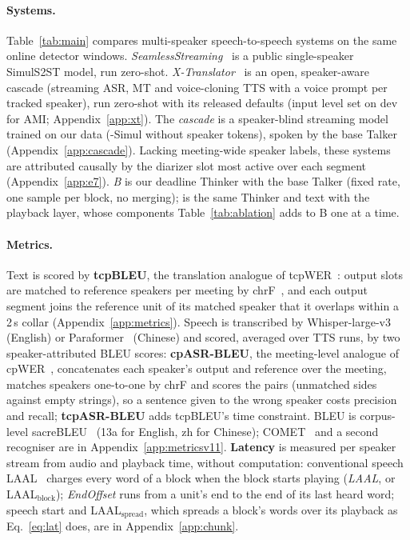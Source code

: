 \paragraph{Systems.} Table~\ref{tab:main} compares multi-speaker speech-to-speech systems on the same online detector
windows. \emph{SeamlessStreaming}~\citep{seamless2023} is a public single-speaker SimulS2ST model, run zero-shot.\ifXT{} \emph{X-Translator}~\citep{zhao2026xtranslator} is an open, speaker-aware cascade (streaming
ASR, MT and voice-cloning TTS with a voice prompt per tracked speaker), run zero-shot with its released defaults (input level set on dev for AMI; Appendix~\ref{app:xt}).\fi\ifCascade{} The
\emph{cascade} is a speaker-blind streaming model trained on our data (\sys{}-Simul without speaker tokens), spoken by
the base Talker (Appendix~\ref{app:cascade}).\fi{} Lacking meeting-wide speaker labels, these
systems are attributed causally by the diarizer slot most active over each segment (Appendix~\ref{app:e7}). \emph{B} is our deadline Thinker with the
base Talker (fixed rate, one sample per block, no merging); \sys{} is the same Thinker and text with the playback layer,
whose components Table~\ref{tab:ablation} adds to B one at a time.

\paragraph{Metrics.} Text is scored by \textbf{tcpBLEU}, the translation analogue of tcpWER~\citep{neumann2023meeteval}:
output slots are matched to reference speakers per meeting by chrF~\citep{popovic2015chrf}, and each output segment
joins the reference unit of its matched speaker that it overlaps within a 2\,s collar (Appendix~\ref{app:metrics}).
Speech is transcribed by Whisper-large-v3~\citep{radford2023robust} (English) or Paraformer~\citep{gao2022paraformer}
(Chinese) and scored, averaged over TTS runs, by two speaker-attributed BLEU scores: \textbf{cpASR-BLEU}, the
meeting-level analogue of cpWER~\citep{watanabe2020chime6}, concatenates each speaker's output and reference over the
meeting, matches speakers one-to-one by chrF and scores the pairs (unmatched sides against empty strings), so a sentence
given to the wrong speaker costs precision and recall; \textbf{tcpASR-BLEU} adds tcpBLEU's time constraint. BLEU is corpus-level sacreBLEU~\citep{post2018call}
(13a for English, zh for Chinese)\ifMetricsV{}; COMET~\citep{rei2022comet} and a second recogniser are in
Appendix~\ref{app:metricsv11}\fi. \textbf{Latency} is measured per speaker stream from audio and playback time, without
computation: conventional speech LAAL~\citep{papi2022over} charges every word of a block when the block starts playing
(\emph{LAAL}, or LAAL$_\text{block}$); \emph{EndOffset} runs from a unit's end to the end of its last heard word; speech
start and LAAL$_\text{spread}$, which spreads a block's words over its playback as Eq.~\eqref{eq:lat} does, are in
Appendix~\ref{app:chunk}.

